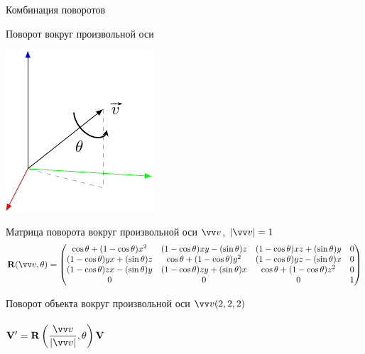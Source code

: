 \documentclass[10pt]{beamer}
\begin{document}
	\begin{frame}{Комбинация поворотов}
	\end{frame}
	
	\begin{frame}{Поворот вокруг произвольной оси}
		
	
		
				\centering
				\includegraphics{rotations2.pdf}
				
		
			\begin{block}{Матрица поворота вокруг произвольной оси $\vv v$, $|\vv v| = 1$}
			\footnotesize
			$$
			\mathbf{R}(\vv v, \theta) = 
			\begin{pmatrix}
				\cos \theta + (1 - \cos \theta) x^2
				& (1 - \cos \theta) x y - (\sin \theta) z 
				& (1 - \cos \theta) x z + (\sin \theta) y  
				& 0\\
				(1 - \cos \theta) y x + (\sin \theta) z 
				& \cos \theta + (1 - \cos \theta) y^2
				& (1 - \cos \theta) y z - (\sin \theta) x
				& 0\\
				(1 - \cos \theta) z x - (\sin \theta) y
				& (1 - \cos \theta) z y + (\sin \theta) x
				& \cos \theta + (1 - \cos \theta) z^2 
				& 0 \\
				0 & 0 & 0 & 1
			\end{pmatrix}
			$$
		\end{block}
		
	\end{frame}
	
  \begin{frame}{Поворот объекта вокруг произвольной оси}
  	{
  	}
  	{
  		$\vv v (2,2,2)$ \\ ~ \\
  		
  		$\mathbf V' = \mathbf R\left(\displaystyle\frac{\vv v }{|\vv v|},\theta\right)\mathbf V$
  	}
  	
  \end{frame}
  
\end{document}
